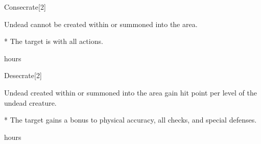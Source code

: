 \begin{spellsection}{Consecrate}[2]
    \begin{spellheader}
    \end{spellheader}
    \begin{spellcontent}
        \begin{spelltargetinginfo}
        \end{spelltargetinginfo}
        \begin{spelleffects}
            \spelleffect Undead cannot be created within or summoned into the area.
            \begin{spelltarget}*
                \spelleffect The target is \impaired with all actions.
            \end{spelltarget}
             hours
        \end{spelleffects}
    \end{spellcontent}
    \begin{spellfooter}
    \end{spellfooter}
\end{spellsection}

\begin{spellsection}{Desecrate}[2]
    \begin{spellheader}
    \end{spellheader}
    \begin{spellcontent}
        \begin{spelltargetinginfo}
        \end{spelltargetinginfo}
        \begin{spelleffects}
            \spelleffect Undead created within or summoned into the area gain  hit point per level of the undead creature.
            \begin{spelltarget}*
                \spelleffect The target gains a  bonus to physical accuracy, all checks, and special defenses.
            \end{spelltarget}
             hours
        \end{spelleffects}
    \end{spellcontent}
    \begin{spellfooter}
    \end{spellfooter}
\end{spellsection}

